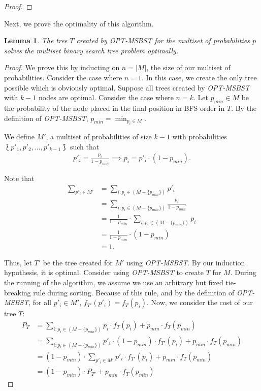 \documentclass[]{beamer}
\theoremstyle{plain}
\newtheorem{lem}[thm]{Lemma}
\begin{document}
\begin{frame}
\begin{proof}
\end{proof}

Next, we prove the optimality of this algorithm. 

\begin{lem}\label{MSSolvesOpt}
The tree $T$ created by \textit{OPT-MSBST} for the multiset of probabilities $p$ solves the multiset binary search tree problem optimally.
\end{lem}

\begin{proof}
We prove this by inducting on $n = |M|$, the size of our multiset of probabilities. Consider the case where $n = 1$. In this case, we create the only tree possible which is obviously optimal. Suppose all trees created by \textit{OPT-MSBST} with $k-1$ nodes are optimal. Consider the case where $n=k$. Let $p_{min} \in M$ be the probability of the node placed in the final position in BFS order in $T$. By the definition of \textit{OPT-MSBST}, $p_{min}=\min_{p_i \in M}$.

\noindent We define $M'$, a multiset of probabilities of size $k-1$ with probabilities $\lbag p'_1, p'_2, ..., p'_{k-1} \rbag$ such that
\begin{align*}
p'_i=\frac{p_i}{1-p_{min}} \implies p_i = p'_i\cdot (1-p_{min}).
\end{align*}

\noindent Note that
\begin{align*}
\sum\limits_{p'_i \in M'} &= \sum_{i : p_i \in (M - \{p_{min}\})}p'_i\\
 &= \sum_{i : p_i \in (M - \{p_{min}\})}\frac{p_i}{1-p_{min}}\\
 &= \frac{1}{1-p_{min}}\cdot \sum_{i : p_i \in (M - \{p_{min}\})}p_i\\
 &= \frac{1}{1-p_{min}}\cdot (1-p_{min})\\
&= 1.
\end{align*}

Thus, let $T'$ be the tree created for $M'$ using \textit{OPT-MSBST}. By our induction hypothesis, it is optimal. Consider using \textit{OPT-MSBST} to create $T$ for $M$. During the running of the algorithm, we assume  we use an arbitrary but fixed tie-breaking rule during sorting. Because of this rule, and by the definition of \textit{OPT-MSBST}, for all $p'_i \in M'$, $f_{T'}(p'_i)=f_T(p_i)$. Now, we consider the cost of our tree $T$:
\begin{align*}
P_T &= \sum_{i:p_i \in (M - \{p_{min}\})} p_i\cdot f_T(p_i) + p_{min}\cdot f_T(p_{min}) \\
&= \sum_{i:p_i \in (M - \{p_{min}\})} p'_i\cdot (1-p_{min})\cdot f_{T'}(p_i) + p_{min}\cdot f_T(p_{min}) \\
&= (1-p_{min})\cdot \sum_{p'_i \in M'} p'_i\cdot f_{T'}(p_i) + p_{min}\cdot f_T(p_{min}) \\
&= (1-p_{min})\cdot P_{T'} + p_{min}\cdot f_T(p_{min})
\end{align*}




\end{proof}
\end{frame}
\end{document}
